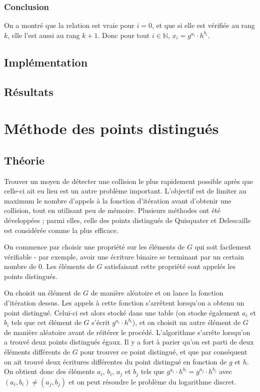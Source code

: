         \subsubsection*{Conclusion}
        On a montré que la relation est vraie pour $i = 0$, et que si elle est vérifiée au rang $k$, elle l'est aussi au rang $k + 1$. Donc pour tout $i \in \mathbb{N}$, $x_i = g^{a_i} \cdot h^{b_i}$.

      \subsection{Implémentation}
      \subsection{Résultats}


    \section{Méthode des points distingués}
      \subsection{Théorie}
      Trouver un moyen de détecter une collision le plus rapidement possible après que celle-ci ait eu lieu est un autre problème important.  L'objectif est de limiter au maximum le nombre d'appels à la fonction d'itération avant d'obtenir une collision, tout en utilisant peu de mémoire. Plusieurs méthodes ont été développées ; parmi elles, celle des points distingués de Quisquater et Delescaille~\autocite[4]{pollard1} est considérée comme la plus efficace.

      On commence par choisir une propriété sur les éléments de $G$ qui soit facilement vérifiable - par exemple, avoir une écriture binaire se terminant par un certain nombre de $0$. Les éléments de $G$ satisfaisant cette propriété sont appelés les points distingués.

      On choisit un élément de $G$ de manière aléatoire et on lance la fonction d'itération dessus. Les appels à cette fonction s'arrêtent lorsqu'on a obtenu un point distingué. Celui-ci est alors stocké dans une table (on stocke également $a_i$ et $b_i$ tels que cet élément de $G$ s'écrit $g^{a_i} \cdot h^{b_i}$), et on choisit un autre élément de $G$ de manière aléatoire avant de réitérer le procédé. L'algorithme s'arrête lorsqu'on a trouvé deux points distingués égaux. Il y a fort à parier qu'on est parti de deux éléments différents de $G$ pour trouver ce point distingué, et que par conséquent on ait trouvé deux écritures différentes du point distingué en fonction de $g$ et $h$. On obtient donc des éléments $a_i$, $b_i$, $a_j$ et $b_j$ tels que $g^{a_i} \cdot h^{b_i} = g^{a_j} \cdot h^{b_j}$ avec $(a_i,b_i) \neq (a_j,b_j)$ et on peut résoudre le problème du logarithme discret.

